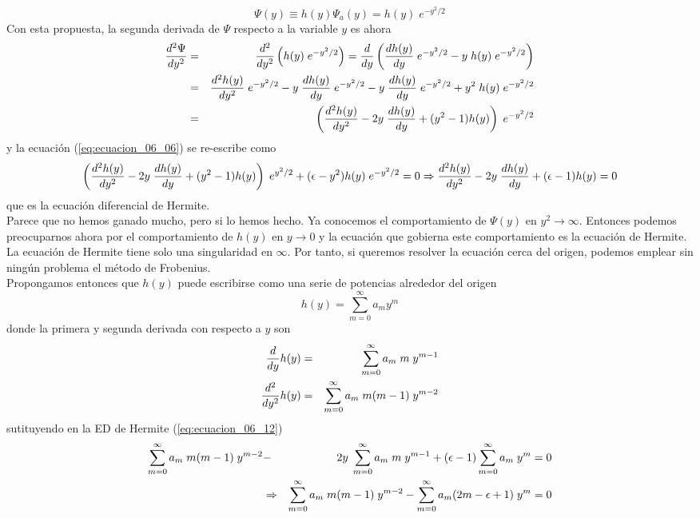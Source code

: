 \begin{equation}
\Psi (y) \equiv h(y) \Psi_{a} (y) = h(y) \; e^{-y^{2}/2}
\label{eq:ecuacion_06_11}
\end{equation}
Con esta propuesta, la segunda derivada de $\Psi$ respecto a la variable $y$ es ahora
\begin{eqnarray*}
\dfrac{d^{2} \Psi}{d y^{2}} &=& \dfrac{d^{2}}{d y^{2}} \left( h(y) \;  e^{-y^{2}/2} \right) = \dfrac{d}{d y} \left( \dfrac{d h(y)}{dy} \; e^{-y^{2}/2} - y \;  h(y) \; e^{-y^{2}/2} \right) \nonumber \\
&=& \dfrac{d^{2} h(y)}{d y^{2}} \; e^{-y^{2}/2} - y \; \dfrac{d h(y)}{d y} \;  e^{-y^{2}/2} - y \; \dfrac{d h(y)}{d y} \; e^{-y^{2}/2} + y^{2} \; h(y) \; e^{-y^{2}/2} \nonumber \\
&=& \left( \dfrac{d^{2} h(y)}{d y^{2}} - 2 y \; \dfrac{d h(y)}{d y} + (y^{2} -1) h(y) \right) \;  e^{-y^{2}/2}  
\end{eqnarray*}
y la ecuación (\ref{eq:ecuacion_06_06}) se re-escribe como
\begin{equation}
\left( \dfrac{d^{2} h(y)}{d y^{2}} - 2 y \; \dfrac{d h(y)}{d y} + (y^{2} -1) h(y) \right) \; e^{y^{2}/2} + (\epsilon - y^{2}) h(y) \; e^{-y^{2}/2} = 0 \nonumber \\
\Rightarrow \dfrac{d^{2} h(y)}{d y^{2}} - 2 y \; \dfrac{d h(y)}{d y} + (\epsilon -1) h(y) = 0
\label{eq:ecuacion_06_12}
\end{equation}
que es la ecuación diferencial de Hermite.
\\
Parece que no hemos ganado mucho, pero si lo hemos hecho. Ya conocemos el comportamiento de $\Psi (y)$ en $y^{2} \to \infty$. Entonces podemos preocuparnos ahora por el comportamiento de $h(y)$ en $y \to 0$ y la ecuación que gobierna este comportamiento es la ecuación de Hermite. La ecuación de Hermite tiene solo una singularidad en $\infty$. Por tanto, si queremos resolver la ecuación cerca del origen, podemos emplear sin ningún problema el método de Frobenius.
\\
Propongamos entonces que $h(y)$ puede escribirse como una serie de potencias alrededor del origen
\begin{equation}
h(y) = \sum_{m=0}^{\infty} a_{m} y^{m}
\label{eq:ecuacion_06_13}
\end{equation}
donde la primera y segunda derivada con respecto a $y$ son
\begin{eqnarray*}
\dfrac{d}{d y} h(y) &=& \sum_{m=0}^{\infty} a_{m} \; m \; y^{m-1} \nonumber \\
\dfrac{d^{2}}{d y^{2}} h(y) &=& \sum_{m=0}^{\infty} a_{m} \; m(m-1) \; y^{m-2}
\end{eqnarray*}
sutituyendo en la ED de Hermite (\ref{eq:ecuacion_06_12})
\begin{eqnarray*}
\sum_{m=0}^{\infty} a_{m} \; m(m-1) \; y^{m-2} &-&  2y \; \sum_{m=0}^{\infty} a_{m} \; m \; y^{m-1} + (\epsilon -1) \sum_{m=0}^{\infty} a_{m} \; y^{m} = 0 \nonumber \\
&\Rightarrow & \sum_{m=0}^{\infty} a_{m} \; m(m-1) \; y^{m-2} - \sum_{m=0}^{\infty} a_{m} (2m - \epsilon + 1) \; y^{m} = 0
\end{eqnarray*}
